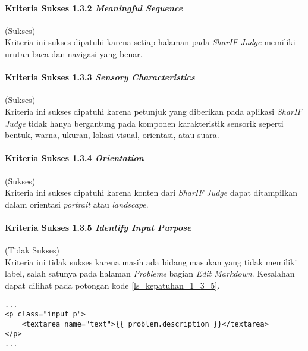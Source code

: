 \paragraph{Kriteria Sukses 1.3.2 \textit{Meaningful Sequence}}
\label{subsubsec:kepatuhan_kriteria_1.3.2}
(Sukses) \\

Kriteria ini sukses dipatuhi karena setiap halaman pada \textit{SharIF Judge} memiliki urutan baca dan navigasi yang benar.

\paragraph{Kriteria Sukses 1.3.3 \textit{Sensory Characteristics}}
\label{subsubsec:kepatuhan_kriteria_1.3.3}
(Sukses)\\

Kriteria ini sukses dipatuhi karena petunjuk yang diberikan pada aplikasi \textit{SharIF Judge} tidak hanya bergantung pada komponen karakteristik sensorik seperti bentuk, warna, ukuran, lokasi visual, orientasi, atau suara.

\paragraph{Kriteria Sukses 1.3.4 \textit{Orientation}}
\label{subsubsec:kepatuhan_kriteria_1.3.4}
(Sukses) \\

Kriteria ini sukses dipatuhi karena konten dari \textit{SharIF Judge} dapat ditampilkan dalam orientasi \textit{portrait} atau \textit{landscape}.

\paragraph{Kriteria Sukses 1.3.5 \textit{Identify Input Purpose}}
\label{subsubsec:kepatuhan_kriteria_1.3.5}
(Tidak Sukses)\\

Kriteria ini tidak sukses karena masih ada bidang masukan yang tidak memiliki label, salah satunya pada halaman \textit{Problems} bagian \textit{Edit Markdown}. Kesalahan dapat dilihat pada potongan kode \ref{ls_kepatuhan_1_3_5}.
\begin{lstlisting}[basicstyle=\ttfamily, frame=single,
columns=fullflexible, keepspaces=true, breaklines=true, label=ls_kepatuhan_1_3_5, caption=Pelanggaran Kriteria Sukses 1.3.5 - Elemen Tidak Diberi Label Pada Halaman \textit{Problems} Bagian \textit{Edit Markdown}]
...
<p class="input_p">
	<textarea name="text">{{ problem.description }}</textarea>
</p>
...
\end{lstlisting}


